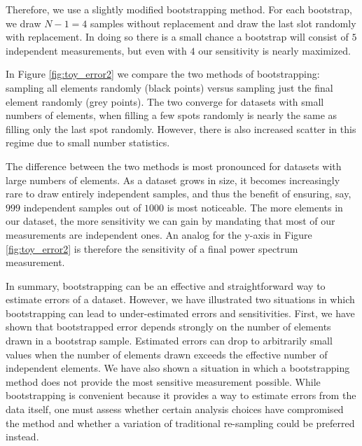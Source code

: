 \documentclass[preprint2,numberedappendix,tighten]{aastex6}  %
\begin{document}
Therefore, we use a slightly modified bootstrapping method. For each bootstrap, we draw $N-1=4$ samples without replacement and draw the last slot randomly with replacement. In doing so there is a small chance a bootstrap will consist of $5$ independent measurements, but even with $4$ our sensitivity is nearly maximized. %

In Figure \ref{fig:toy_error2} we compare the two methods of bootstrapping: sampling all elements randomly (black points) versus sampling just the final element randomly (grey points). The two converge for datasets with small numbers of elements, when filling a few spots randomly is nearly the same as filling only the last spot randomly. However, there is also increased scatter in this regime due to small number statistics. 

The difference between the two methods is most pronounced for datasets with large numbers of elements. As a dataset grows in size, it becomes increasingly rare to draw entirely independent samples, and thus the benefit of ensuring, say, $999$ independent samples out of $1000$ is most noticeable. The more elements in our dataset, the more sensitivity we can gain by mandating that most of our measurements are independent ones. An analog for the y-axis in Figure \ref{fig:toy_error2} is therefore the sensitivity of a final power spectrum measurement.

In summary, bootstrapping can be an effective and straightforward way to estimate errors of a dataset. However, we have illustrated two situations in which bootstrapping can lead to under-estimated errors and sensitivities. First, we have shown that bootstrapped error depends strongly on the number of elements drawn in a bootstrap sample. Estimated errors can drop to arbitrarily small values when the number of elements drawn exceeds the effective number of independent elements. We have also shown a situation in which a bootstrapping method does not provide the most sensitive measurement possible. While bootstrapping is convenient because it provides a way to estimate errors from the data itself, one must assess whether certain analysis choices have compromised the method and whether a variation of traditional re-sampling could be preferred instead.
\end{document}
